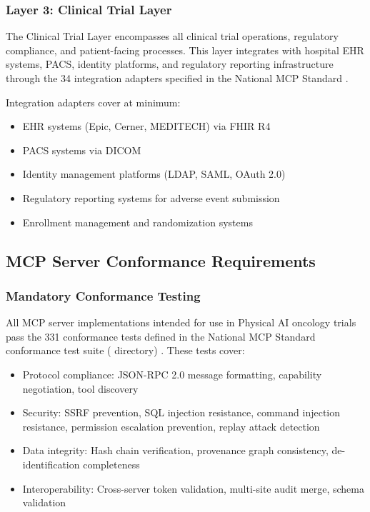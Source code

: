 \documentclass[11pt,letterpaper]{article}
\begin{document}
\subsubsection{Layer 3: Clinical Trial Layer}

The Clinical Trial Layer encompasses all clinical trial operations, regulatory compliance, and patient-facing processes. This layer integrates with hospital EHR systems, PACS, identity platforms, and regulatory reporting infrastructure through the 34 integration adapters specified in the National MCP Standard \cite{kawchak2026nationalmcp}.

Integration adapters \SHALL{} cover at minimum:
\begin{itemize}
  \item EHR systems (Epic, Cerner, MEDITECH) via FHIR R4
  \item PACS systems via DICOM
  \item Identity management platforms (LDAP, SAML, OAuth 2.0)
  \item Regulatory reporting systems for adverse event submission
  \item Enrollment management and randomization systems
\end{itemize}

\subsection{MCP Server Conformance Requirements}

\subsubsection{Mandatory Conformance Testing}

All MCP server implementations intended for use in Physical AI oncology trials \SHALL{} pass the 331 conformance tests defined in the National MCP Standard conformance test suite ( directory) \cite{kawchak2026nationalmcp}. These tests cover:

\begin{itemize}
  \item Protocol compliance: JSON-RPC 2.0 message formatting, capability negotiation, tool discovery
  \item Security: SSRF prevention, SQL injection resistance, command injection resistance, permission escalation prevention, replay attack detection
  \item Data integrity: Hash chain verification, provenance graph consistency, de-identification completeness
  \item Interoperability: Cross-server token validation, multi-site audit merge, schema validation
\end{itemize}
\end{document}
